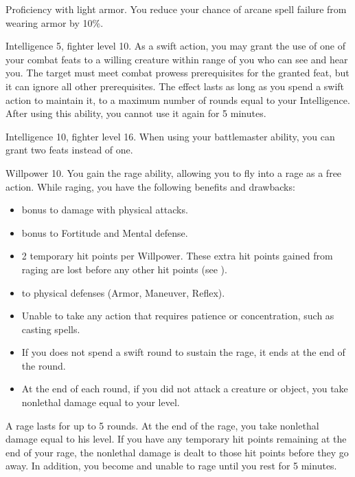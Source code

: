 \featpre Proficiency with light armor.
\featben You reduce your chance of arcane spell failure from wearing armor by 10\%.

\featpres Intelligence 5, fighter level 10.
\featben As a swift action, you may grant the use of one of your combat feats to a willing creature within \rngmed range of you who can see and hear you.
The target must meet combat prowess prerequisites for the granted feat, but it can ignore all other prerequisites.
The effect lasts as long as you spend a swift action to maintain it, to a maximum number of rounds equal to your Intelligence.
After using this ability, you cannot use it again for 5 minutes.

\featpres Intelligence 10, fighter level 16.
\featben When using your battlemaster ability, you can grant two feats instead of one.

\featpres Willpower 10.
\featben You gain the rage ability, allowing you to fly into a rage as a free action.
While raging, you have the following benefits and drawbacks:
\begin{itemize}
    \item {} bonus to damage with physical attacks.
    \item {} bonus to Fortitude and Mental defense.
    \item 2 temporary hit points per Willpower.
        These extra hit points gained from raging are lost before any other hit points (see ).
    \item {} to physical defenses (Armor, Maneuver, Reflex).
    \item Unable to take any action that requires patience or concentration, such as casting spells.
    \item If you does not spend a swift round to sustain the rage, it ends at the end of the round.
    \item At the end of each round, if you did not attack a creature or object, you take nonlethal damage equal to your level.
\end{itemize}

A rage lasts for up to 5 rounds.
At the end of the rage, you take nonlethal damage equal to his level.
If you have any temporary hit points remaining at the end of your rage, the nonlethal damage is dealt to those hit points before they go away.
In addition, you become \fatigued and unable to rage until you rest for 5 minutes.

